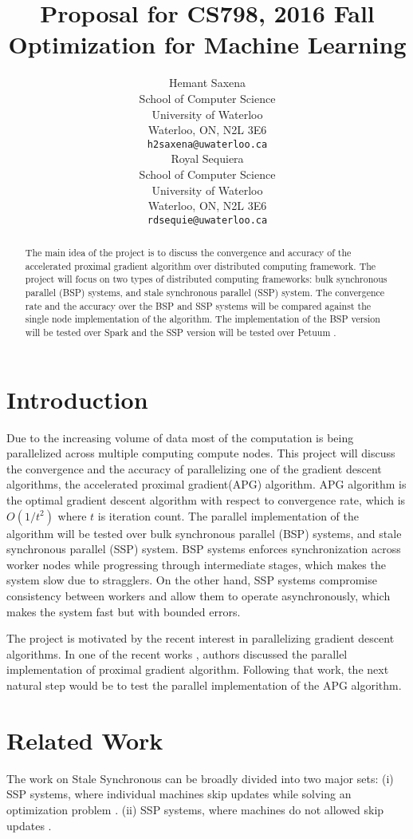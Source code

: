 \documentclass{article}
\title{Proposal for CS798, 2016 Fall\\ \large Optimization for Machine Learning}
\author{
	Hemant Saxena \\
	School of Computer Science\\
	University of Waterloo\\
	Waterloo, ON, N2L 3E6 \\
	\texttt{h2saxena@uwaterloo.ca} \\
	\And
	Royal Sequiera\\
	School of Computer Science\\
	University of Waterloo\\
	Waterloo, ON, N2L 3E6 \\
	\texttt{rdsequie@uwaterloo.ca} \\	
}
\begin{document}
\maketitle

\begin{abstract} 
The main idea of the project is to discuss the convergence and accuracy of the accelerated proximal gradient algorithm \cite{apg} over distributed computing framework.
The project will focus on two types of distributed computing frameworks: bulk synchronous parallel (BSP) systems, and stale synchronous parallel (SSP) system.
The convergence rate and the accuracy over the BSP and SSP systems will be compared against the single node implementation of the algorithm.
The implementation of the BSP version will be tested over Spark \cite{spark} and the SSP version will be tested over Petuum \cite{petuum}.
\end{abstract} 

\section{Introduction}
Due to the increasing volume of data most of the computation is being parallelized across multiple computing compute nodes.
This project will discuss the convergence and the accuracy of parallelizing one of the gradient descent algorithms, the accelerated proximal gradient(APG) algorithm.
APG algorithm is the optimal gradient descent algorithm with respect to convergence rate, which is $O(1/t^2)$ where $t$ is iteration count.
The parallel implementation of the algorithm will be tested over bulk synchronous parallel (BSP) systems, and stale synchronous parallel (SSP) system.
BSP systems enforces synchronization across worker nodes while progressing through intermediate stages, which makes the system slow due to stragglers.
On the other hand, SSP systems compromise consistency between workers and allow them to operate asynchronously, which makes the system fast but with bounded errors.

The project is motivated by the recent interest in parallelizing gradient descent algorithms.
In one of the recent works \cite{zhou2016convergence}, authors discussed the parallel implementation of proximal gradient algorithm.
Following that work, the next natural step would be to test the parallel implementation of the APG algorithm.

\section{Related Work}
The work on Stale Synchronous can be broadly divided into two major sets: 
(i) SSP systems, where individual machines skip updates while solving an optimization 
problem \cite{feyzmahdavian2014convergence,bertsekas1989convergence,bertsekas1989parallel,tseng1991rate,tsitsiklis1984distributed}. 
(ii) SSP systems, where machines do not allowed skip 
updates \cite{li2014scaling,li2013distributed,li2013parameter,feyzmahdavian2014delayed,ho2013more}.
\end{document}
